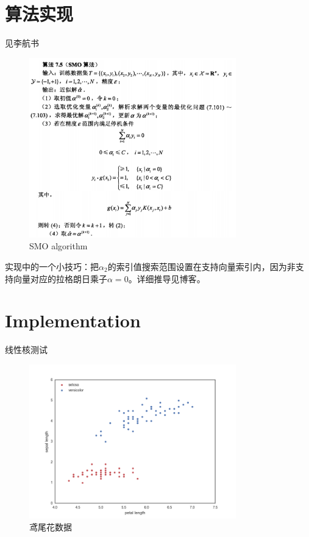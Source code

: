 \documentclass{ctexart}
\begin{document}
\section{算法实现}
见李航书\cite{LiHang:Statistic}
\begin{figure}[H]
\begin{center}
\includegraphics[width=0.8\textwidth]{fig/smo.png} %
\caption{SMO algorithm}
\end{center}
\end{figure}

实现中的一个小技巧：把$\alpha_2$的索引值搜索范围设置在支持向量索引内，因为非支持向量对应的拉格朗日乘子$\alpha=0$。详细推导见博客\cite{alpha:derive}。

%
\section{Implementation}
线性核测试
\begin{figure}[H]
\begin{center}
\includegraphics[width=0.8\textwidth]{fig/raw_linear.png} %
\caption{鸢尾花数据}
\end{center}
\end{figure}
\end{document}
